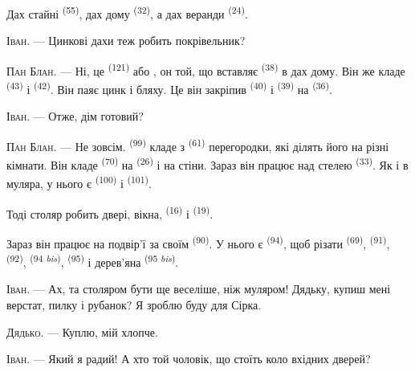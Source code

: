 Дах стайні  \textsuperscript{(55)}, дах дому
 \textsuperscript{(32)}, а дах веранди 
\textsuperscript{(24)}.

\textsc{Іван}. --- Цинкові дахи теж робить покрівельник?

\textsc{Пан Блан}. --- Ні, це  \textsuperscript{(121)} або
, он той, що вставляє 
\textsuperscript{(38)} в дах дому. Він же кладе 
\textsuperscript{(43)} і  \textsuperscript{(42)}. Він
паяє цинк і бляху. Це він закріпив  \textsuperscript{(40)} і
 \textsuperscript{(39)} на 
\textsuperscript{(36)}.

\textsc{Іван}. --- Отже, дім готовий?

\VUsaut{3.0mm}
\VUsaut{3.0mm}

\textsc{Пан Блан}. --- Не зовсім.  \textsuperscript{(99)} кладе
з  \textsuperscript{(61)} перегородки, які ділять його на різні
кімнати. Він кладе  \textsuperscript{(70)} на 
\textsuperscript{(26)} і на стіни. Зараз він працює над стелею 
\textsuperscript{(33)}. Як і в муляра, у нього є 
\textsuperscript{(100)} і  \textsuperscript{(101)}.

Тоді столяр робить двері, вікна, 
\textsuperscript{(16)} і  \textsuperscript{(19)}.

Зараз він працює на подвір'ї за своїм  \textsuperscript{(90)}.
У нього є  \textsuperscript{(94)}, щоб різати 
\textsuperscript{(69)},  \textsuperscript{(91)},
 \textsuperscript{(92)},  \textsuperscript{(94
\textit{bis})},  \textsuperscript{(95)} і дерев'яна
 \textsuperscript{(95 \textit{bis})}.

\textsc{Іван}. --- Ах, та столяром бути ще веселіше, ніж муляром! Дядьку,
купиш мені верстат, пилку і рубанок? Я зроблю буду для Сірка.

\textsc{Дядько}. --- Куплю, мій хлопче.

\textsc{Іван}. --- Який я радий! А хто той чоловік, що стоїть коло вхідних
дверей?

